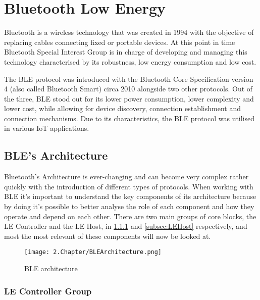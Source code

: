 \section{Bluetooth Low Energy}
\label{sec:ble}

Bluetooth is a wireless technology that was created in 1994 with the objective of replacing cables connecting fixed or portable devices. At this point in time Bluetooth Special Interest Group is in charge of developing and managing this technology characterised by its robustness, low energy consumption and low cost. 

The \ac{BLE} protocol was introduced with the Bluetooth Core Specification version 4 (also called Bluetooth Smart) circa 2010 alongside two other protocols.  Out of the three, \ac{BLE} stood out for its lower power consumption, lower complexity and lower cost, while allowing for  device discovery, connection establishment and connection mechanisms. Due to its characteristics, the \ac{BLE} protocol was utilised in various \ac{IoT} applications.  

\subsection{\ac{BLE}'s Architecture}
\label{subsec:BLEArchitecture}

Bluetooth's Architecture is ever-changing and can become very complex rather quickly with the introduction of different types of protocols.
 When working with \ac{BLE} it's important to understand the key components of its architecture  because by doing it's possible to better analyse the role of each component and how they operate and depend on each other. There are two main groups of core blocks, the \ac{LE} Controller and the \ac{LE} Host, in \ref{subsec:LEController} and \ref{subsec:LEHost} respectively, and most the most relevant of these components will now be looked at.
 
 \begin{figure}[H]
	\centering
		\texttt{[image: 2.Chapter/BLEArchitecture.png]}
	\caption[\ac{BLE} Architecture]{\ac{BLE} architecture}
	\label{fig:BLEarchitecture}
\end{figure}

\subsubsection{ \ac{LE} Controller Group}
\label{subsec:LEController}

